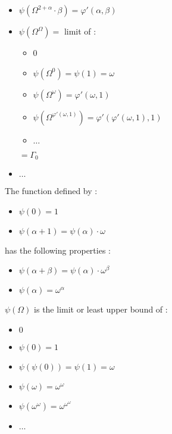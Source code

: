 \documentclass[10pt]{article}
\begin{document}
\begin{itemize}
\item \( \psi(\Omega^{2+\alpha} \cdot \beta) = \varphi'(\alpha,\beta) \)
\item \( \psi(\Omega^\Omega) = \) limit of : 
   \begin{itemize}
     \setlength{\itemsep}{1pt}
     \setlength{\parskip}{0pt}
     \setlength{\parsep}{0pt}
   \item 0
   \item \( \psi(\Omega^0) = \psi(1) = \omega \)
   \item \( \psi(\Omega^\omega) = \varphi'(\omega,1) \)
   \item \( \psi(\Omega^{\varphi'(\omega,1)}) = \varphi'(\varphi'(\omega,1),1) \)
   \item \( \ldots \)
   \end{itemize} 
   \( = \Gamma_0 \)
\item \( \ldots \)
\end{itemize}

\bigskip

The function defined by :

\begin{itemize}
     \setlength{\itemsep}{1pt}
     \setlength{\parskip}{0pt}
     \setlength{\parsep}{0pt}
\item \( \psi(0) = 1 \)
\item \( \psi(\alpha+1) = \psi(\alpha) \cdot \omega \)
\end{itemize}

has the following properties :

\begin{itemize}
     \setlength{\itemsep}{1pt}
     \setlength{\parskip}{0pt}
     \setlength{\parsep}{0pt}
\item \( \psi(\alpha+\beta)=\psi(\alpha) \cdot \omega^\beta \)
\item \( \psi(\alpha) = \omega^\alpha \)
\end{itemize}

\( \psi(\Omega) \) is the limit or least upper bound of :

\begin{itemize}
     \setlength{\itemsep}{1pt}
     \setlength{\parskip}{0pt}
     \setlength{\parsep}{0pt}
\item \( 0 \)
\item \( \psi(0) = 1 \)
\item \( \psi(\psi(0)) = \psi(1) = \omega \)
\item \( \psi(\omega) = \omega^\omega \)
\item \( \psi(\omega^\omega) = \omega^{\omega^\omega} \)
\item \( \ldots \)
\end{itemize}
\end{document}

